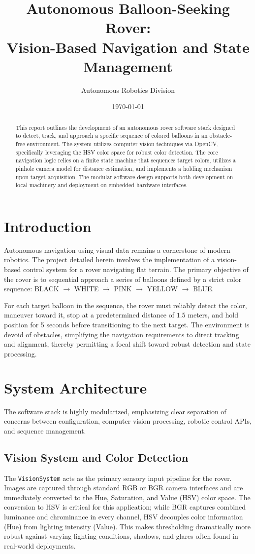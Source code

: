 \documentclass[12pt,a4paper]{article}
\title{\textbf{Autonomous Balloon-Seeking Rover: \\ Vision-Based Navigation and State Management}}
\author{Autonomous Robotics Division}
\date{\today}
\begin{document}
\maketitle

\begin{abstract}
This report outlines the development of an autonomous rover software stack designed to detect, track, and approach a specific sequence of colored balloons in an obstacle-free environment. The system utilizes computer vision techniques via OpenCV, specifically leveraging the HSV color space for robust color detection. The core navigation logic relies on a finite state machine that sequences target colors, utilizes a pinhole camera model for distance estimation, and implements a holding mechanism upon target acquisition. The modular software design supports both development on local machinery and deployment on embedded hardware interfaces.
\end{abstract}

\section{Introduction}
Autonomous navigation using visual data remains a cornerstone of modern robotics. The project detailed herein involves the implementation of a vision-based control system for a rover navigating flat terrain. The primary objective of the rover is to sequential approach a series of balloons defined by a strict color sequence: BLACK $\rightarrow$ WHITE $\rightarrow$ PINK $\rightarrow$ YELLOW $\rightarrow$ BLUE. 

For each target balloon in the sequence, the rover must reliably detect the color, maneuver toward it, stop at a predetermined distance of $1.5$ meters, and hold position for 5 seconds before transitioning to the next target. The environment is devoid of obstacles, simplifying the navigation requirements to direct tracking and alignment, thereby permitting a focal shift toward robust detection and state processing.

\section{System Architecture}

The software stack is highly modularized, emphasizing clear separation of concerns between configuration, computer vision processing, robotic control APIs, and sequence management. 

\subsection{Vision System and Color Detection}
The \texttt{VisionSystem} acts as the primary sensory input pipeline for the rover. Images are captured through standard RGB or BGR camera interfaces and are immediately converted to the Hue, Saturation, and Value (HSV) color space. The conversion to HSV is critical for this application; while BGR captures combined luminance and chrominance in every channel, HSV decouples color information (Hue) from lighting intensity (Value). This makes thresholding dramatically more robust against varying lighting conditions, shadows, and glares often found in real-world deployments.
\end{document}
